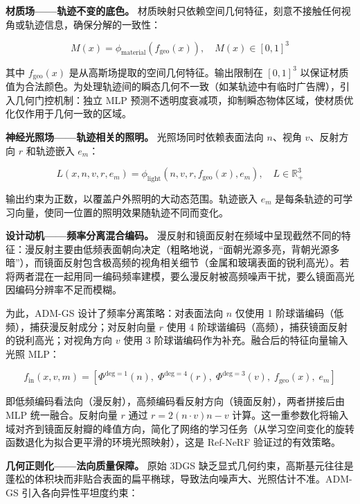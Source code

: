 \textbf{材质场——轨迹不变的底色。} 材质映射只依赖空间几何特征，刻意不接触任何视角或轨迹信息，确保分解的一致性：

\begin{equation}
M(x) = \phi_{\text{material}}(f_{\text{geo}}(x)), \quad M(x) \in [0,1]^3
\end{equation}

其中 $f_{\text{geo}}(x)$ 是从高斯场提取的空间几何特征。输出限制在 $[0,1]^3$ 以保证材质值为合法颜色。为处理轨迹间的瞬态几何不一致（如某轨迹中有临时广告牌），引入几何门控机制：独立 MLP 预测不透明度衰减项，抑制瞬态物体区域，使材质优化仅作用于几何一致的区域。

\textbf{神经光照场——轨迹相关的照明。} 光照场同时依赖表面法向 $n$、视角 $v$、反射方向 $r$ 和轨迹嵌入 $e_m$：

\begin{equation}
L(x, n, v, r, e_m) = \phi_{\text{light}}(n, v, r, f_{\text{geo}}(x), e_m), \quad L \in \mathbb{R}_+^3
\end{equation}

输出约束为正数，以覆盖户外照明的大动态范围。轨迹嵌入 $e_m$ 是每条轨迹的可学习向量，使同一位置的照明效果随轨迹不同而变化。

\textbf{设计动机——频率分离混合编码。} 漫反射和镜面反射在频域中呈现截然不同的特征：漫反射主要由低频表面朝向决定（粗略地说，``面朝光源多亮，背朝光源多暗''），而镜面反射包含极高频的视角相关细节（金属和玻璃表面的锐利高光）。若将两者混在一起用同一编码频率建模，要么漫反射被高频噪声干扰，要么镜面高光因编码分辨率不足而模糊。

为此，ADM-GS 设计了频率分离策略：对表面法向 $n$ 仅使用 1 阶球谐编码（低频），捕获漫反射成分；对反射向量 $r$ 使用 4 阶球谐编码（高频），捕获镜面反射的锐利高光；对视角方向 $v$ 使用 3 阶球谐编码作为补充。融合后的特征向量输入光照 MLP：

\begin{equation}
f_{\text{in}}(x, v, m) = [\Phi^{\text{deg}=1}(n),\; \Phi^{\text{deg}=4}(r),\; \Phi^{\text{deg}=3}(v),\; f_{\text{geo}}(x),\; e_m]
\end{equation}

即低频编码看法向（漫反射），高频编码看反射方向（镜面反射），两者拼接后由 MLP 统一融合。反射向量 $r$ 通过 $r = 2(n \cdot v)n - v$ 计算。这一重参数化将输入域对齐到镜面反射瓣的峰值方向，简化了网络的学习任务（从学习空间变化的旋转函数退化为拟合更平滑的环境光照映射），这是 Ref-NeRF 验证过的有效策略。

\textbf{几何正则化——法向质量保障。} 原始 3DGS 缺乏显式几何约束，高斯基元往往是蓬松的体积块而非贴合表面的扁平椭球，导致法向噪声大、光照估计不准。ADM-GS 引入各向异性平坦度约束：

